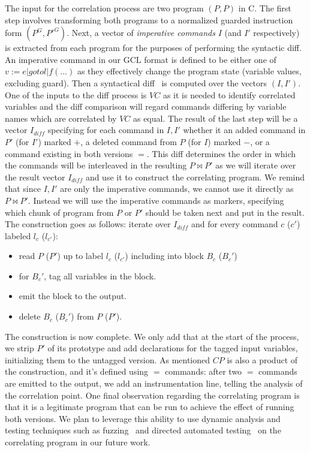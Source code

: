 The input for the correlation process are two program $(P,P)$ in C. The first step involves transforming both programs to a normalized guarded instruction form $(P^{G},P'^{G})$. Next, a vector of \emph{imperative commands} $I$ (and $I'$ respectively) is extracted from each program for the purposes of performing the syntactic diff. An imperative command in our GCL format is defined to be either one of $v := e | goto l | f(...)$ as they effectively change the program state (variable values, excluding guard). Then a syntactical diff~\cite{HuntMcIlroy75} is computed over the vectors $(I,I')$. One of the inputs to the diff process is $VC$ as it is needed to identify correlated variables and the diff comparison will regard commands differing by variable names which are correlated by $VC$ as equal. The result of the last step will be a vector $I_{diff}$ specifying for each command in $I,I'$ whether it an added command in $P'$ (for $I'$) marked $+$, a deleted command from $P$ (for $I$) marked $-$, or a command existing in both versions $=$. This diff determines the order in which the commands will be interleaved in the resulting $P \bowtie P'$ as we will iterate over the result vector $I_{diff}$ and use it to construct the correlating program. We remind that since $I,I'$ are only the imperative commands, we cannot use it directly as $P \bowtie P'$. Instead we will use the imperative commands as markers, specifying which chunk of program from $P$ or $P'$ should be taken next and put in the result. The construction goes as follows: iterate over $I_{diff}$ and for every command $c$ ($c'$) labeled $l_c$ ($l_{c'}$):
\begin{itemize}
\item read $P$ ($P'$) up to label $l_c$ ($l_{c'}$) including into block $B_c$ ($B_c'$)
\item for $B_c'$, tag all variables in the block.
\item emit the block to the output.
\item delete $B_c$ ($B_c'$) from $P$ ($P'$).
\end{itemize}
The construction is now complete. We only add that at the start of the process, we strip $P'$ of its prototype and add declarations for the tagged input variables, initializing them to the untagged version.
As mentioned $CP$ is also a product of the construction, and it's defined using $=$ commands: after two $=$ commands are emitted to the output, we add an instrumentation line, telling the analysis of the correlation point.
One final observation regarding the correlating program is that it is a legitimate program that can be run to achieve the effect of running both versions. We plan to leverage this ability to use dynamic analysis and testing techniques such as fuzzing~\cite{NethercoteSeward07} and directed automated testing~\cite{CadarDunbarEngler08} on the correlating program in our future work.
